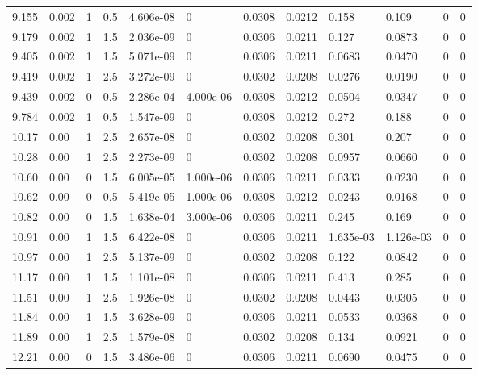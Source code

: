 \documentclass[preview]{standalone}
\begin{document}
{{{\begin{tabular}{L{1.2cm}C{1.2cm} C{0.3cm}C{0.5cm} C{1.4cm}C{1.4cm} C{1.4cm}C{1.4cm} C{1.6cm}C{1.6cm} C{1.6cm}C{1.6cm}}
  9.155  &  0.002  & 1     & 0.5 &  4.606e-08  & 0  &  0.0308&   0.0212& 0.158 & 0.109   &  0 & 0  \\ 
  9.179  &  0.002  & 1     & 1.5 &  2.036e-09  & 0  &  0.0306&   0.0211& 0.127 & 0.0873   &  0 & 0  \\ 
  9.405  &  0.002  & 1     & 1.5 &  5.071e-09  & 0  &  0.0306&   0.0211& 0.0683 & 0.0470   &  0 & 0  \\ 
  9.419  &  0.002  & 1     & 2.5 &  3.272e-09  & 0  &  0.0302&   0.0208& 0.0276 & 0.0190   &  0 & 0  \\ 
  9.439  &  0.002  & 0     & 0.5 &  2.286e-04  & 4.000e-06  &  0.0308&   0.0212& 0.0504 & 0.0347   &  0 & 0  \\ 
  9.784  &  0.002  & 1     & 0.5 &  1.547e-09  & 0  &  0.0308&   0.0212& 0.272 & 0.188   &  0 & 0  \\ 
  10.17  &  0.00  & 1     & 2.5 &  2.657e-08  & 0  &  0.0302&   0.0208& 0.301 & 0.207   &  0 & 0  \\ 
  10.28  &  0.00  & 1     & 2.5 &  2.273e-09  & 0  &  0.0302&   0.0208& 0.0957 & 0.0660   &  0 & 0  \\ 
  10.60  &  0.00  & 0     & 1.5 &  6.005e-05  & 1.000e-06  &  0.0306&   0.0211& 0.0333 & 0.0230   &  0 & 0  \\ 
  10.62  &  0.00  & 0     & 0.5 &  5.419e-05  & 1.000e-06  &  0.0308&   0.0212& 0.0243 & 0.0168   &  0 & 0  \\ 
  10.82  &  0.00  & 0     & 1.5 &  1.638e-04  & 3.000e-06  &  0.0306&   0.0211& 0.245 & 0.169   &  0 & 0  \\ 
  10.91  &  0.00  & 1     & 1.5 &  6.422e-08  & 0  &  0.0306&   0.0211& 1.635e-03 & 1.126e-03   &  0 & 0  \\ 
  10.97  &  0.00  & 1     & 2.5 &  5.137e-09  & 0  &  0.0302&   0.0208& 0.122 & 0.0842   &  0 & 0  \\ 
  11.17  &  0.00  & 1     & 1.5 &  1.101e-08  & 0  &  0.0306&   0.0211& 0.413 & 0.285   &  0 & 0  \\ 
  11.51  &  0.00  & 1     & 2.5 &  1.926e-08  & 0  &  0.0302&   0.0208& 0.0443 & 0.0305   &  0 & 0  \\ 
  11.84  &  0.00  & 1     & 1.5 &  3.628e-09  & 0  &  0.0306&   0.0211& 0.0533 & 0.0368   &  0 & 0  \\ 
  11.89  &  0.00  & 1     & 2.5 &  1.579e-08  & 0  &  0.0302&   0.0208& 0.134 & 0.0921   &  0 & 0  \\ 
  12.21  &  0.00  & 0     & 1.5 &  3.486e-06  & 0  &  0.0306&   0.0211& 0.0690 & 0.0475   &  0 & 0  \\ 

\end{tabular}}}}
\end{document}
